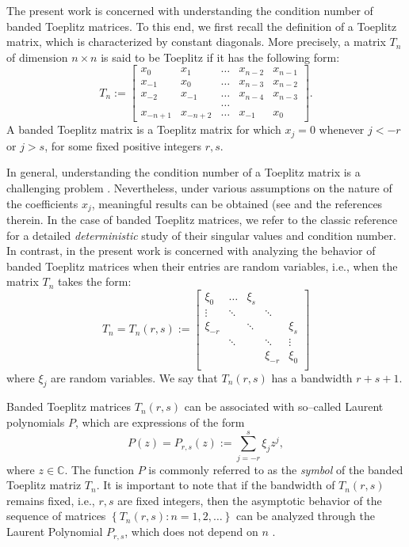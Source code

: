 \documentclass[12pt]{amsart}
\theoremstyle{plain}
\numberwithin{equation}{section}
\newcommand{\<}{\langle}
\renewcommand{\>}{\rangle}
\newcommand{\CC}[1]{\left[#1\right]}
\newcommand{\LL}[1]{\left\{#1\right\}}
\newcommand{\C}{\mathds{C}}
\begin{document}
The present work is concerned with understanding the condition number of banded Toeplitz matrices. To this end, we first  recall the definition of a Toeplitz matrix, which is characterized by constant diagonals. More precisely, a matrix $T_n$ of dimension $n\times n$ is said to be Toeplitz if it has the following form:
\[
T_n :=
\CC{\begin{array}{ccccc}
x_0 & x_1 & \ldots & x_{n-2} & x_{n-1} \\
x_{-1} & x_{0} & \ldots & x_{n-3} & x_{n-2} \\
x_{-2} & x_{-1} & \ldots & x_{n-4} & x_{n-3} \\
& & \ldots & & \\
x_{-n+1} & x_{-n+2} & \ldots & x_{-1} & x_{0} 
\end{array}}. 
\]
A banded Toeplitz matrix is a Toeplitz matrix for which $x_j=0$ whenever $j<-r$ or $j>s$, for some fixed positive integers $r,s$.

In general, understanding the condition number of a Toeplitz matrix is a challenging problem \cite{PhysRevE.102.040101, bogomolny2021statistical}. Nevertheless, under various assumptions on the nature of the coefficients $x_{j}$, meaningful results can be obtained (see \cite{bogomolny2021statistical, manrique-miron2022random, onatski2026smallest} and the references therein. In the case of banded Toeplitz matrices, we refer to the classic reference \cite{bottcher2005spectral} for a detailed {\it deterministic} study of their singular values and condition number. In contrast, in the present work is concerned with analyzing the behavior of banded Toeplitz matrices when their entries are random variables, i.e., when the matrix $T_n$ takes the form:
\[
T_n= T_n(r,s) :=
\CC{\begin{array}{ccccc}
\xi_{0} & \ldots & \xi_{s} &  &  \\
\vdots & \ddots &  & \ddots& \\
\xi_{-r} &  & \ddots & & \xi_{s} \\
 & \ddots &  & \ddots & \vdots \\
 & &  & \xi_{-r} & \xi_{0} \\
\end{array}}
\]
where $\xi_j$ are random variables. We say that $T_n(r,s)$ has a bandwidth $r+s+1$. 

Banded Toeplitz matrices $T_n(r,s)$ can be associated with so--called Laurent polynomials $P$, which are expressions of the form
\[
P(z) =P_{r,s}(z) := \sum_{j=-r}^{s} \xi_j z^{j},
\]
where $z\in\C$. The function $P$ is commonly referred to as the {\it symbol} of the banded Toeplitz matriz $T_n$. It is important to note that if the bandwidth of $T_n(r,s)$ remains fixed, i.e., $r,s$ are fixed integers, then the asymptotic behavior of the sequence of matrices $\LL{T_n(r,s): n=1,2,\ldots}$ can be analyzed through the Laurent Polynomial $P_{r,s}$, which does not depend on $n$ \cite{bottcher2005spectral}. 
\end{document}
